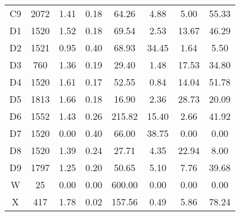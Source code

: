 \begin{table}[h!]
\begin{tabular}{c c c c c c c c}
			C9	 & 	2072	 & 	1.41	 & 	0.18	 & 	64.26	 & 	4.88	 & 	5.00	 & 	55.33 \\
			D1	 & 	1520	 & 	1.52	 & 	0.18	 & 	69.54	 & 	2.53	 & 	13.67	 & 	46.29 \\
			D2	 & 	1521	 & 	0.95	 & 	0.40	 & 	68.93	 & 	34.45	 & 	1.64	 & 	5.50 \\
			D3	 & 	760	 & 	1.36	 & 	0.19	 & 	29.40	 & 	1.48	 & 	17.53	 & 	34.80 \\
			D4	 & 	1520	 & 	1.61	 & 	0.17	 & 	52.55	 & 	0.84	 & 	14.04	 & 	51.78 \\
			D5	 & 	1813	 & 	1.66	 & 	0.18	 & 	16.90	 & 	2.36	 & 	28.73	 & 	20.09 \\
			D6	 & 	1552	 & 	1.43	 & 	0.26	 & 	215.82	 & 	15.40	 & 	2.66	 & 	41.92 \\
			D7	 & 	1520	 & 	0.00	 & 	0.40	 & 	66.00	 & 	38.75	 & 	0.00	 & 	0.00 \\
			D8	 & 	1520	 & 	1.39	 & 	0.24	 & 	27.71	 & 	4.35	 & 	22.94	 & 	8.00 \\
			D9	 & 	1797	 & 	1.25	 & 	0.20	 & 	50.65	 & 	5.10	 & 	7.76	 & 	39.68 \\
			W	 & 	25	 & 	0.00	 & 	0.00	 & 	600.00	 & 	0.00	 & 	0.00	 & 	0.00 \\
			X	 & 	417	 & 	1.78	 & 	0.02	 & 	157.56	 & 	0.49	 & 	5.86	 & 	78.24 \\
			\hline		
		\end{tabular}
		
		\label{table:soil_prop}
	\end{table}	
	